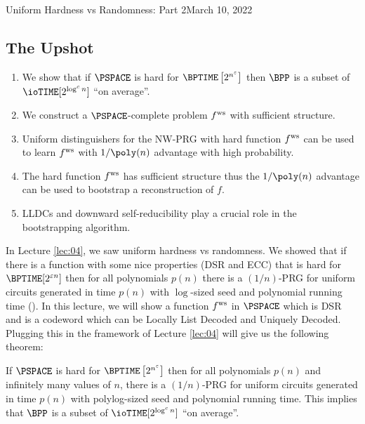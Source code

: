 \newcommand{\fn}{\mathbb{F}_n}
\newcommand\antipi{\rotatebox[origin=c]{180}{$\Pi$}}
\newcommand{\ceil}[1]{{\left\lceil{#1}\right\rceil}}


\begin{lecture}{8}{Uniform Hardness vs Randomness: Part 2}{March 10, 2022}\label{lec:08}

\subsection*{The Upshot}

\begin{enumerate}
	\item We show that if $\PSPACE$ is hard for $\BPTIME\left[2^{n^\eps}\right]$ then $\BPP$ is a subset of \\ $\ioTIME[2^{\log^c n}]$ ``on average''.
	\item We construct a $\PSPACE$-complete problem $ f^{\text{ws}} $ with sufficient structure.
	\item Uniform distinguishers for the NW-PRG with hard function $ f^{\text{ws}} $ can be
	used to learn $ f^{\text{ws}} $ with $1/\poly(n)$ advantage with high probability.
	\item The hard function $ f^{\text{ws}} $ has sufficient structure thus the $1/\poly(n)$
	advantage can be used to bootstrap a reconstruction of $f$.
	\item LLDCs and downward self-reducibility play a crucial role in the
	bootstrapping algorithm.
\end{enumerate}

In Lecture \ref{lec:04}, we saw uniform hardness vs randomness. We showed that if there is a function with some nice properties (DSR and ECC) that is hard for $\BPTIME\brac{2^{\eps n}}$ then for all polynomials $p(n)$ there is a $(1 / n)$-PRG for uniform circuits generated in time $p(n)$ with $\log$-sized seed and polynomial running time (). 
In this lecture, we will show a function $ f^{\text{ws}} $ in $\PSPACE$ which is DSR and  is a codeword which can be Locally List Decoded and Uniquely Decoded. Plugging this in the framework of Lecture \ref{lec:04} will give us the following theorem:
\begin{theorem}\label{thm:uniform-hard-random-PSPACE}
	If $\PSPACE$ is hard for $\BPTIME\left[2^{n^\eps}\right]$ then for all polynomials $p(n)$ and infinitely many values of $n$, there is a $(1/n)$-PRG for uniform circuits generated in time $p(n)$ with polylog-sized seed and polynomial running time. This implies that $\BPP$ is a subset of $\ioTIME[2^{\log^c n}]$ ``on average''.
\end{theorem}



\end{lecture}
